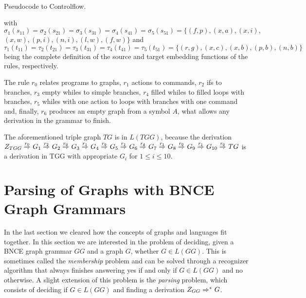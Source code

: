 \documentclass[]{report}
\begin{document}
\begin{example}{Pseudocode to Controlflow.}
	
	
	\noindent
	with $\sigma_1(s_{11}) = \sigma_2(s_{21}) = \sigma_3(s_{31}) = \sigma_4(s_{41}) =\sigma_5(s_{51}) = \{ (f,p), (x,a), (x,i),$ $ (x,w), (p,i), (n,i), (l,w), (f,w) \}$ and $\tau_1(t_{11}) = \tau_2(t_{21}) = \tau_3(t_{31}) = \tau_4(t_{41}) =\tau_5(t_{51}) = \{ (r,g), (x,c), (x,b), (p,b), (n,b)\}$ being the complete definition of the source and target embedding functions of the rules, respectively.
	
	The rule $r_0$ relates programs to graphs, $r_1$ actions to commands, $r_2$ ifs to branches, $r_3$ empty whiles to simple branches, $r_4$ filled whiles to filled loops with branches, $r_5$ whiles with one action to loops with branches with one command and, finally, $r_6$ produces an empty graph from a symbol $A$, what allows any derivation in the grammar to finish.
	
	The aforementioned triple graph $TG$ is in $L(TGG)$, because the derivation
	$
	\startTG{TGG} \tderiv{r_0}{}{} G_1 \tderiv{r_2}{}{} G_2 \tderiv{r_6}{}{} G_3 \tderiv{r_1}{}{} G_4 \tderiv{r_6}{}{} G_5 \tderiv{r_1}{}{} G_6 \tderiv{r_4}{}{} G_7 \tderiv{r_1}{}{} G_8 \tderiv{r_6}{}{} G_9 \tderiv{r_1}{}{} G_{10} \tderiv{r_6}{}{} TG
	$
	is a derivation in TGG with appropriate $G_i$ for $1 \le i \le 10$.
\end{example}

\section{Parsing of Graphs with BNCE Graph Grammars}
In the last section we cleared how the concepts of graphs and languages fit together. In this section we are interested in the problem of deciding, given a BNCE graph grammar $GG$ and a graph $G$, whether $G \in L(GG)$. This is sometimes called the \textit{membership} problem and can be solved through a recognizer algorithm that always finishes answering yes if and only if $G \in L(GG)$ and no otherwise. A slight extension of this problem is the \textit{parsing} problem, which consists of deciding if $G \in L(GG)$ and finding a derivation $\startG{GG} \derivtr{}{}{} G$.

\end{document}
